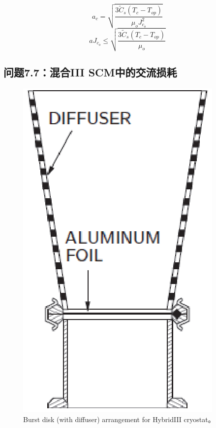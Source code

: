 \begin{equation}%
a_c=\sqrt{\frac{3\tilde{C}_s(T_c-T_{op})}{\mu_oJ_{c_o}^{2}}}
\end{equation}
\begin{equation}%
aJ_{c_o}\leq\sqrt{\frac{3\tilde{C}_s(T_c-T_{op})}{\mu_o}}
\end{equation}


\subsection{问题7.7：混合III SCM中的交流损耗}
\begin{figure}[htbp]
	\centering
	\includegraphics[scale=0.7]{chpt7/figs/fig7.21.eps}
	\caption{Burst disk (with diffuser) arrangement for HybridIII cryostat。}
\end{figure}



